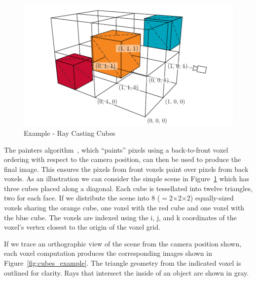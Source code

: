 \begin{figure}[!h]
\centering
  \includegraphics[width=6in]{drawings/examples/cube_example/cubes_visio.pdf}
\caption{Example - Ray Casting Cubes}
\label{fig:cubes_3d}
\end{figure}

The painters algorithm~\cite{book-shirley}, which ``paints'' pixels 
using a back-to-front voxel ordering with respect to the camera position, can
then be used to produce the final image.  This ensures the pixels from
front voxels paint over pixels from back voxels.  As an illustration we can
consider the simple scene in Figure~\ref{fig:cubes_3d} which has three cubes
placed along a diagonal.  Each cube is tessellated into twelve triangles, two
for each face.  If we distribute the scene into 8 ($=$2$\times$2$\times$2)
equally-sized voxels sharing the orange cube, one voxel with the red cube and
one voxel with the blue cube.  The voxels are indexed using the i, j, and k
coordinates of the voxel's vertex closest to the origin of the voxel grid.

If we trace an orthographic view of the scene from the camera position shown,
each voxel computation produces the corresponding images shown in
Figure~\ref{fig:cubes_example}.  The triangle geometry from the indicated voxel is
outlined for clarity. Rays that intersect the inside of an object are shown in
gray.

